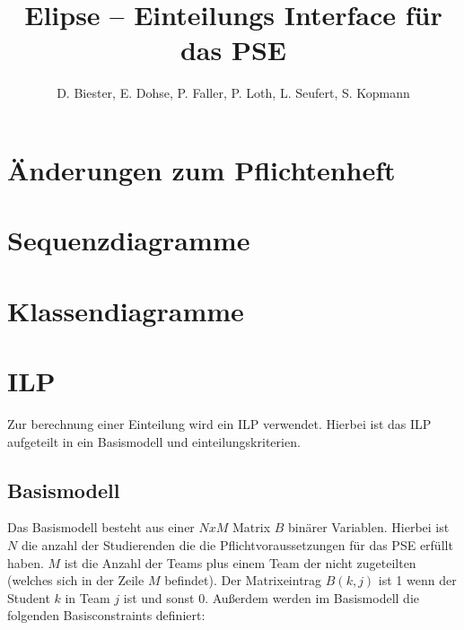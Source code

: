 \documentclass[parskip=full]{scrartcl}
\begin{document}
\title{Elipse -- Einteilungs Interface für das PSE}
\author{D. Biester, E. Dohse, P. Faller, P. Loth, L. Seufert, S. Kopmann}
\zweitgutachter{}

\tableofcontents
\pagebreak



\section{Änderungen zum Pflichtenheft}

\section{Sequenzdiagramme}

\section{Klassendiagramme}

\section{ILP}
Zur berechnung einer Einteilung wird ein ILP verwendet. Hierbei ist das ILP
aufgeteilt in ein Basismodell und einteilungskriterien.
\subsection{Basismodell}
Das Basismodell besteht aus einer $N x M$ Matrix $B$ binärer Variablen. Hierbei
ist $N$ die anzahl der Studierenden die die Pflichtvoraussetzungen für das PSE
erfüllt haben. $M$ ist die Anzahl der Teams plus einem Team
der nicht zugeteilten (welches sich in der Zeile $M$ befindet). Der
Matrixeintrag $B(k,j)$ ist 1 wenn der Student $k$ in Team $j$ ist und sonst 0.
Außerdem werden im Basismodell die folgenden Basisconstraints definiert:
\end{document}
